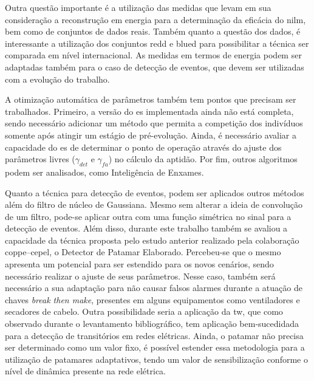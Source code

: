 Outra questão importante é a utilização das medidas que levam em sua
consideração a reconstrução em energia para a determinação da eficácia
do \acs{nilm}, bem como de conjuntos de dados reais. Também quanto a
questão dos dados, é interessante a utilização dos conjuntos
\acs{redd} e \acs{blued} para possibilitar a técnica ser comparada em
nível internacional. As medidas em termos de energia podem ser
adaptadas também para o caso de detecção de eventos, que devem ser
utilizadas com a evolução do trabalho.

A otimização automática de parâmetros também tem pontos que precisam
ser trabalhados. Primeiro, a versão do \acs{es} implementada ainda não
está completa, sendo necessário adicionar um método que permita a
competição dos indivíduos somente após atingir um estágio de
pré-evolução. Ainda, é necessário avaliar a capacidade do \acs{es} de
determinar o ponto de operação através do ajuste dos parâmetros livres
($\gamma_{det}$ e $\gamma_{fa}$) no cálculo da aptidão. Por
fim, outros algoritmos podem ser analisados, como Inteligência de
Enxames.

Quanto a técnica para detecção de eventos, podem ser aplicados outros
métodos além do filtro de núcleo de Gaussiana. Mesmo sem alterar a
ideia de convolução de um filtro, pode-se aplicar outra com uma função
simétrica no sinal para a detecção de eventos. Além disso,
durante este trabalho também se avaliou a capacidade da técnica
proposta pelo estudo anterior realizado pela colaboração
\acs{coppe}--\acs{cepel}, o Detector de Patamar Elaborado.
Percebeu-se que o mesmo apresenta um potencial para ser estendido para
os novos cenários, sendo necessário realizar o ajuste de seus
parâmetros. Nesse caso, também será necessário a sua adaptação para
não causar falsos alarmes durante a atuação de chaves \emph{break then
make}, presentes em alguns equipamentos como ventiladores e secadores
de cabelo. Outra possibilidade seria a aplicação da \gls{tw}, que como
observado durante o levantamento bibliográfico, tem aplicação
bem-sucedidada para a detecção de transitórios em redes elétricas.
Ainda, o patamar não precisa ser determinado como um valor fixo, é
possível estender essa metodologia para a utilização de patamares
adaptativos, tendo um valor de sensibilização conforme o nível de
dinâmica presente na rede elétrica.




